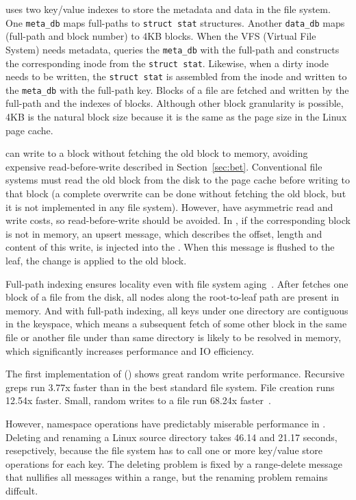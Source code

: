 \betrfs uses two key/value indexes to store the metadata and data in the file
system.
One \texttt{meta\_db} maps full-paths to \texttt{struct stat} structures.
Another \texttt{data\_db} maps (full-path and block number) to 4KB blocks.
When the VFS (Virtual File System) needs metadata, \betrfs queries
the \texttt{meta\_db} with the full-path and constructs the corresponding inode
from the \texttt{struct stat}.
Likewise, when a dirty inode needs to be written, the \texttt{struct stat} is
assembled from the inode and written to the \texttt{meta\_db} with the
full-path key.
Blocks of a file are fetched and written by the full-path and the indexes of
blocks.
Although other block granularity is possible, 4KB is the natural block size
because it is the same as the page size in the Linux page cache.

\betrfs can write to a block without fetching the old block to memory, avoiding
expensive read-before-write described in Section~\ref{sec:bet}.
Conventional file systems must read the old block from the disk to the page
cache before writing to that block (a complete overwrite can be done without
fetching the old block, but it is not implemented in any file system).
However, \bets have asymmetric read and write costs, so read-before-write should
be avoided.
In \betrfs, if the corresponding block is not in memory, an upsert message,
which describes the offset, length and content of this write, is injected into
the \bet.
When this message is flushed to the leaf, the change is applied to the old
block.

Full-path indexing ensures locality even with file system aging~\citep{betrfs3}.
After \betrfs fetches one block of a file from the disk, all nodes along the
root-to-leaf path are present in memory.
And with full-path indexing, all keys under one directory are contiguous in the
keyspace, which means a subsequent fetch of some other block in the same file or
another file under than same directory is likely to be resolved in memory,
which significantly increases performance and IO efficiency.

The first implementation of \betrfs (\betrfsOne) shows great random write
performance.
Recursive greps run 3.77x faster than in the best standard file system.
File creation runs 12.54x faster.
Small, random writes to a file run 68.24x faster~\citep{betrfs1tos}.

However, namespace operations have predictably miserable performance in
\betrfsOne.
Deleting and renaming a Linux source directory takes 46.14 and 21.17 seconds,
resepctively, because the file system has to call one or more key/value store
operations for each key.
The deleting problem is fixed by a range-delete message that nullifies all
messages within a range, but the renaming problem remains diffcult.

